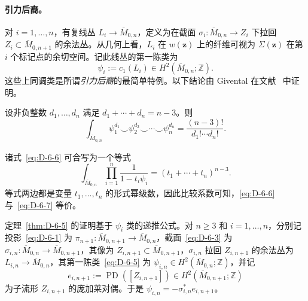 \paragraph{引力后裔。}
对 $i=1,\ldots,n$，有复线丛 $L_i\to\overline M_{0,n}$，定义为在截面 $\sigma_i:\overline M_{0,n}\to Z_i$ 下拉回 $Z_i\subset\overline M_{0,n+1}$ 的余法丛。从几何上看，$L_i$ 在 $w(\mathbf z)$ 上的纤维可视为 $\Sigma(\mathbf z)$ 在第 $i$ 个标记点的余切空间。记此线丛的第一陈类为
\begin{equation}\label{eq:D-6-5}
  \psi_i:=c_1(L_i)\in H^2(\overline M_{0,n};\mathbb Z).
\end{equation}
这些上同调类是所谓\emph{引力后裔}的最简单特例。以下结论由 Givental 在文献~ 中证明。

\begin{theorem}\label{thm:D-6-5}
设非负整数 $d_1,\ldots,d_n$ 满足 $d_1+\cdots+d_n=n-3$。则
\begin{equation}\label{eq:D-6-6}
  \int_{\overline M_{0,n}}\psi_1^{d_1}\smile\psi_2^{d_2}
    \smile\cdots\smile\psi_n^{d_n}
  =\frac{(n-3)!}{d_1!\cdots d_n!}.
\end{equation}
\end{theorem}
诸式~\eqref{eq:D-6-6} 可合写为一个等式
\begin{equation}\label{eq:D-6-7}
  \int_{\overline M_{0,n}}\prod_{i=1}^{n}\frac{1}{1-t_i\psi_i}
  =(t_1+\cdots+t_n)^{n-3}.
\end{equation}
等式两边都是变量 $t_1,\ldots,t_n$ 的形式幂级数，因此比较系数可知，\eqref{eq:D-6-6} 与~\eqref{eq:D-6-7} 等价。

定理~\ref{thm:D-6-5} 的证明基于 $\psi_i$ 类的递推公式。对 $n\ge3$ 和 $i=1,\ldots,n$，分别记投影~\eqref{eq:D-6-1} 为 $\pi_{n+1}:\overline M_{0,n+1}\to\overline M_{0,n}$，截面~\eqref{eq:D-6-3} 为 $\sigma_{i,n}:\overline M_{0,n}\to\overline M_{0,n+1}$，其像为 $Z_{i,n+1}\subset\overline M_{0,n+1}$，$\sigma_{i,n}$ 拉回 $Z_{i,n+1}$ 的余法丛为 $L_{i,n}\to\overline M_{0,n}$，其第一陈类~\eqref{eq:D-6-5} 为 $\psi_{i,n}\in H^2(\overline M_{0,n};\mathbb Z)$，并记
\[
  e_{i,n+1}:=\operatorname{PD}([Z_{i,n+1}])
     \in H^2(\overline M_{0,n+1};\mathbb Z)
\]
为子流形 $Z_{i,n+1}$ 的庞加莱对偶。于是 $\psi_{i,n}=-\sigma_{i,n}^{*}e_{i,n+1}$。

